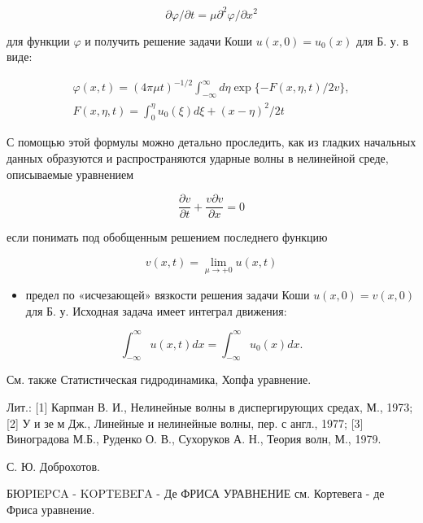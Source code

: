 \documentclass[10pt]{article}
\begin{document}
\[

\partial \varphi / \partial t=\mu \partial^{2} \varphi / \partial x^{2}

\]



для функции $\varphi$ и получить решение задачи Коши $u(x, 0)=u_{0}(x)$ для Б. у. в виде:



\[

\begin{gathered}

\varphi(x, t)=(4 \pi \mu t)^{-1 / 2} \int_{-\infty}^{\infty} d \eta \exp \{-F(x, \eta, t) / 2 v\}, \\

F(x, \eta, t)=\int_{0}^{\eta} u_{0}(\xi) d \xi+(x-\eta)^{2} / 2 t

\end{gathered}

\]



С помощью этой формулы можно детально проследить, как из гладких начальных данных образуются и распространяются ударные волны в нелинейной среде, описываемые уравнением



\[

\frac{\partial v}{\partial t}+\frac{v \partial v}{\partial x}=0

\]



если понимать под обобщенным решением последнего функцию



\[

v(x, t)=\lim _{\mu \rightarrow+0} u(x, t)

\]



\begin{itemize}

  \item предел по «исчезающей» вязкости решения задачи Коши $u(x, 0)=v(x, 0)$ для Б. у. Исходная задача имеет интеграл движения:

\end{itemize}



\[

\int_{-\infty}^{\infty} u(x, t) d x=\int_{-\infty}^{\infty} u_{0}(x) d x .

\]



См. также Статистическая гидродинамика, Хопфа уравнение.



Лит.: [1] Карпман В. И., Нелинейные волны в диспергирующих средах, М., 1973; [2] У и зе м Дж., Линейные и нелинейные волны, пер. с англ., 1977; [3] Виноградова М.Б., Руденко О. В., Сухоруков А. Н., Теория волн, М., 1979.



С. Ю. Доброхотов.



БЮPIEPCA - KOPTEBEГA - Де ФРИСА УРАВНЕНИЕ см. Кортевега - де Фриса уравнение.
\end{document}
